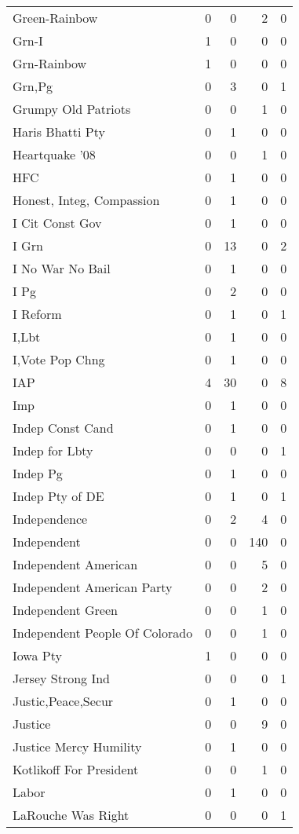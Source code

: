 \begin{supertabular}{lrrrr}
Green-Rainbow & 0 & 0 & 2 & 0\\
Grn-I & 1 & 0 & 0 & 0\\
Grn-Rainbow & 1 & 0 & 0 & 0\\
Grn,Pg & 0 & 3 & 0 & 1\\
Grumpy Old Patriots & 0 & 0 & 1 & 0\\
Haris Bhatti Pty & 0 & 1 & 0 & 0\\
Heartquake '08 & 0 & 0 & 1 & 0\\
HFC & 0 & 1 & 0 & 0\\
Honest, Integ, Compassion & 0 & 1 & 0 & 0\\
I Cit Const Gov & 0 & 1 & 0 & 0\\
I Grn & 0 & 13 & 0 & 2\\
I No War No Bail & 0 & 1 & 0 & 0\\
I Pg & 0 & 2 & 0 & 0\\
I Reform & 0 & 1 & 0 & 1\\
I,Lbt & 0 & 1 & 0 & 0\\
I,Vote Pop Chng & 0 & 1 & 0 & 0\\
IAP & 4 & 30 & 0 & 8\\
Imp & 0 & 1 & 0 & 0\\
Indep Const Cand & 0 & 1 & 0 & 0\\
Indep for Lbty & 0 & 0 & 0 & 1\\
Indep Pg & 0 & 1 & 0 & 0\\
Indep Pty of DE & 0 & 1 & 0 & 1\\
Independence & 0 & 2 & 4 & 0\\
Independent & 0 & 0 & 140 & 0\\
Independent American & 0 & 0 & 5 & 0\\
Independent American Party & 0 & 0 & 2 & 0\\
Independent Green & 0 & 0 & 1 & 0\\
Independent People Of Colorado & 0 & 0 & 1 & 0\\
Iowa Pty & 1 & 0 & 0 & 0\\
Jersey Strong Ind & 0 & 0 & 0 & 1\\
Justic,Peace,Secur & 0 & 1 & 0 & 0\\
Justice & 0 & 0 & 9 & 0\\
Justice Mercy Humility & 0 & 1 & 0 & 0\\
Kotlikoff For President & 0 & 0 & 1 & 0\\
Labor & 0 & 1 & 0 & 0\\
LaRouche Was Right & 0 & 0 & 0 & 1\\

\end{supertabular}
